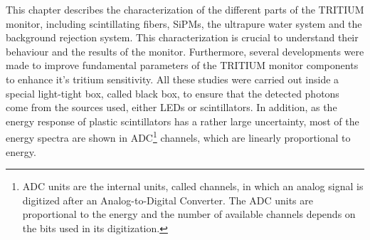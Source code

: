 This chapter describes the characterization of the different parts of the TRITIUM monitor, including scintillating fibers, SiPMs, the ultrapure water system and the background rejection system. This characterization is crucial to understand their behaviour and the results of the monitor. Furthermore, several developments were made  to improve fundamental parameters of the TRITIUM monitor components to enhance it's tritium sensitivity. All these studies were carried out inside a special light-tight box, called black box, to ensure that the detected photons come from the sources used, either LEDs or scintillators. In addition, as the energy response of plastic scintillators has a rather large uncertainty, most of the energy spectra are shown in ADC\footnote{ADC units are the internal units, called channels, in which an analog signal is digitized after an Analog-to-Digital Converter. The ADC units are proportional to the energy and the number of available channels depends on the bits used in its digitization.} channels, which are linearly proportional to energy.